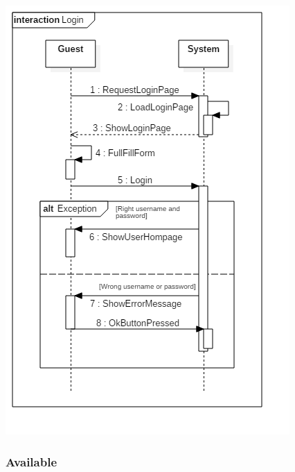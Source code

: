 \documentclass[english]{article}
\begin{document}
\includegraphics[width=\textwidth]{Login}

\subsubsection{Available}
\end{document}
